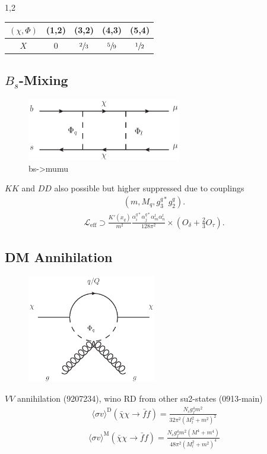 \documentclass[11pt,a4paper,twoside]{article}
\numberwithin{equation}{section}
\begin{document}
\begin{spacing}{1,2}
\begin{table}[h]
\begin{tabular}{c|cccc}
 $(\chi,\Phi)$& (1,2) & (3,2) & (4,3) & (5,4)\\
 \hline
 $X$ & 0 & $\sfrac23$ & $\sfrac59$ & $\sfrac12$ 
 \end{tabular}
 
\end{table}




\subsection{$B_s$-Mixing}
\begin{figure}[t]
 \includegraphics[width=0.6\textwidth]{../pics/bsmumu.eps}
 \caption{bs->mumu}
 \label{pic_Bsmix}
\end{figure}
$KK$ and $DD$ also possible but higher suppressed due to couplings
\begin{align}
 \left(m, M_q, g_3^{q*}g_2^q\right).
\end{align}
\begin{align}
 \mathcal{L}_\text{eff} \supset \frac{K'(x_q)}{m^2}\frac{\alpha_i^{q*} \alpha_j^{q*} \alpha_m^l \alpha_n^l}{128\pi^2}\times\left(O_\delta + \frac23 O_\tau\right).
 \label{eq_LagBSmixModB}
\end{align}


\subsection{DM Annihilation}
\begin{figure}[t]
 \includegraphics[width=0.5\textwidth]{../pics/phigluon.eps}
\end{figure}
$VV$ annihilation (9207234), wino RD from other su2-states (0913-main)
\begin{align}
 \langle \sigma v \rangle^\text{D} \left(\bar \chi \chi \rightarrow \bar f f\right) = \frac{N_c g_f^4 m^2}{32\pi^2\left(M_l^2 + m^2\right)^2}
\end{align}
\begin{align}
 \langle \sigma v \rangle^\text{M} \left(\bar \chi \chi \rightarrow \bar f f\right) = \frac{N_c g_f^4 m^2 \left(M^4+m^4 \right)}{48\pi^2\left(M_l^2 + m^2\right)^4}
\end{align}



\end{spacing}
\end{document}
